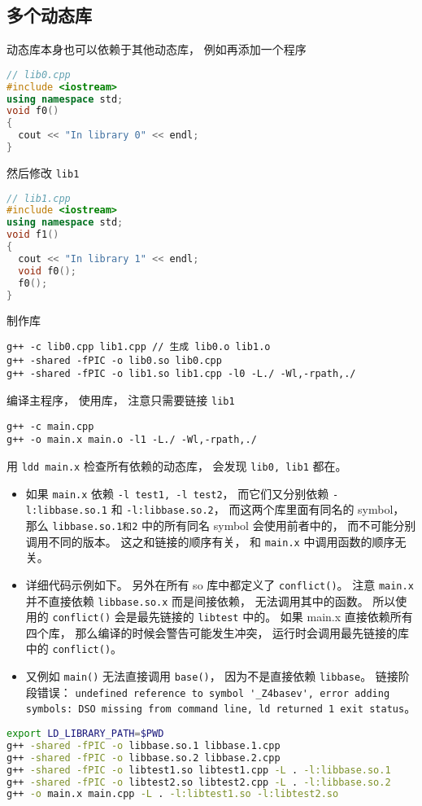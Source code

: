 \subsection{多个动态库}
动态库本身也可以依赖于其他动态库， 例如再添加一个程序
\begin{lstlisting}[language=cpp]
// lib0.cpp
#include <iostream>
using namespace std;
void f0()
{
  cout << "In library 0" << endl;
}
\end{lstlisting}
然后修改 \verb`lib1`
\begin{lstlisting}[language=cpp]
// lib1.cpp
#include <iostream>
using namespace std;
void f1()
{
  cout << "In library 1" << endl;
  void f0();
  f0();
}
\end{lstlisting}
制作库
\begin{lstlisting}[language=none]
g++ -c lib0.cpp lib1.cpp // 生成 lib0.o lib1.o
g++ -shared -fPIC -o lib0.so lib0.cpp
g++ -shared -fPIC -o lib1.so lib1.cpp -l0 -L./ -Wl,-rpath,./
\end{lstlisting}
编译主程序， 使用库， 注意只需要链接 \verb`lib1`
\begin{lstlisting}[language=none]
g++ -c main.cpp
g++ -o main.x main.o -l1 -L./ -Wl,-rpath,./
\end{lstlisting}
用 \verb`ldd main.x` 检查所有依赖的动态库， 会发现 \verb`lib0, lib1` 都在。

\begin{itemize}
\item 如果 \verb`main.x` 依赖 \verb`-l test1, -l test2`， 而它们又分别依赖 \verb`-l:libbase.so.1` 和 \verb`-l:libbase.so.2`， 而这两个库里面有同名的 symbol， 那么 \verb`libbase.so.1和2` 中的所有同名 symbol 会使用前者中的， 而不可能分别调用不同的版本。 这之和链接的顺序有关， 和 \verb`main.x` 中调用函数的顺序无关。
\item 详细代码示例如下。 另外在所有 so 库中都定义了 \verb`conflict()`。 注意 \verb`main.x` 并不直接依赖 \verb`libbase.so.x` 而是间接依赖， 无法调用其中的函数。 所以使用的 \verb`conflict()` 会是最先链接的 \verb`libtest` 中的。 如果 main.x 直接依赖所有四个库， 那么编译的时候会警告可能发生冲突， 运行时会调用最先链接的库中的 \verb`conflict()`。
\item 又例如 \verb`main()` 无法直接调用 \verb`base()`， 因为不是直接依赖 \verb`libbase`。 链接阶段错误： \verb`undefined reference to symbol '_Z4basev', error adding symbols: DSO missing from command line, ld returned 1 exit status`。
\end{itemize}

\begin{lstlisting}[language=bash, caption=make.sh（注意要 source make.sh 而不是 ./make.sh）]
export LD_LIBRARY_PATH=$PWD
g++ -shared -fPIC -o libbase.so.1 libbase.1.cpp
g++ -shared -fPIC -o libbase.so.2 libbase.2.cpp
g++ -shared -fPIC -o libtest1.so libtest1.cpp -L . -l:libbase.so.1
g++ -shared -fPIC -o libtest2.so libtest2.cpp -L . -l:libbase.so.2
g++ -o main.x main.cpp -L . -l:libtest1.so -l:libtest2.so
\end{lstlisting}


